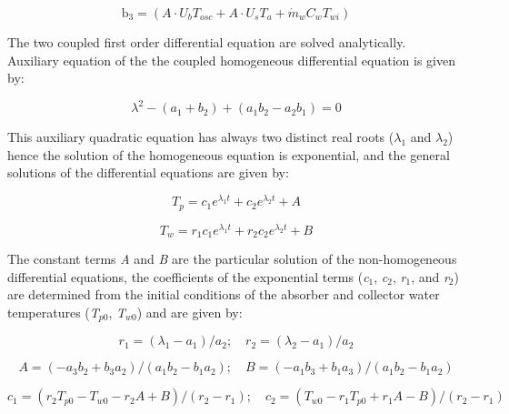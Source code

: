 \begin{equation}
{{\mathrm{b}}_{\mathrm{3}}} = {\mathrm{ }}\left( {A \cdot {U_b}{T_{osc}} + A \cdot {U_s}{T_a} + {{\dot m}_w}{C_w}{T_{wi}}} \right)
\end{equation}

The two coupled first order differential equation are solved analytically.~ Auxiliary equation of the the coupled homogeneous differential equation is given by:

\begin{equation}
{\lambda ^2} - ({a_1} + {b_2}) + ({a_1}{b_2} - {a_2}{b_1}) = 0
\end{equation}

This auxiliary quadratic equation has always two distinct real roots (\(\lambda_{1}\) and \(\lambda_{2}\)) hence the solution of the homogeneous equation is exponential, and the general solutions of the differential equations are given by:

\begin{equation}
{T_p} =  {c_1}{e^{{\lambda_1}t}} + {c_2}{e^{{\lambda_2}t}} + A
\end{equation}

\begin{equation}
{T_w} =  {r_1}{c_1}{e^{{\lambda_1}t}} + {r_2}{c_2}{e^{{\lambda_2}t}} + B
\end{equation}

The constant terms \emph{A} and \emph{B} are the particular solution of the non-homogeneous differential equations, the coefficients of the exponential terms (\emph{c\(_{1}\)}, \emph{c\(_{2}\)}, \emph{r\(_{1}\)}, and \emph{r\(_{2}\)}) are determined from the initial conditions of the absorber and collector water temperatures (\emph{T\(_{p0}\)}, \emph{T\(_{w0}\)}) and are given by:

\begin{equation}
{r_1} =  ({\lambda_1} - {a_1})/{a_2};\quad {r_2} =  ({\lambda_2} - {a_1})/{a_2}
\end{equation}

\begin{equation}
A =  ( - {a_3}{b_2} + {b_3}{a_2})/({a_1}{b_2} - {b_1}{a_2});\quad B =  ( - {a_1}{b_3} + {b_1}{a_3})/({a_1}{b_2} - {b_1}{a_2})
\end{equation}

\begin{equation}
{c_1} =  ({r_2}{T_{p0}} - {T_{w0}} - {r_2}A + B)/({r_2} - {r_1});\quad {c_2} =  ({T_{w0}} - {r_1}{T_{p0}} + {r_1}A - B)/({r_2} - {r_1})
\end{equation}

